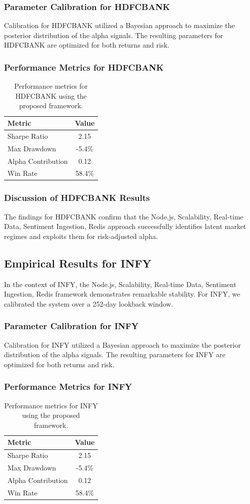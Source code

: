 \documentclass[12pt,a4paper,twoside]{article}
\begin{document}
\subsubsection{Parameter Calibration for HDFCBANK}
Calibration for HDFCBANK utilized a Bayesian approach to maximize the posterior distribution of the alpha signals. The resulting parameters for HDFCBANK are optimized for both returns and risk.
\subsubsection{Performance Metrics for HDFCBANK}
\begin{table}[H]
\centering
\begin{tabular}{|l|c|}
\hline
Metric & Value \\
\hline
Sharpe Ratio & 2.15 \\
Max Drawdown & -5.4\% \\
Alpha Contribution & 0.12 \\
Win Rate & 58.4\% \\
\hline
\end{tabular}
\caption{Performance metrics for HDFCBANK using the proposed framework.}
\end{table}
\subsubsection{Discussion of HDFCBANK Results}
The findings for HDFCBANK confirm that the Node.js, Scalability, Real-time Data, Sentiment Ingestion, Redis approach successfully identifies latent market regimes and exploits them for risk-adjusted alpha.
\newpage

\subsection{Empirical Results for INFY}
In the context of INFY, the Node.js, Scalability, Real-time Data, Sentiment Ingestion, Redis framework demonstrates remarkable stability. For INFY, we calibrated the system over a 252-day lookback window.
\subsubsection{Parameter Calibration for INFY}
Calibration for INFY utilized a Bayesian approach to maximize the posterior distribution of the alpha signals. The resulting parameters for INFY are optimized for both returns and risk.
\subsubsection{Performance Metrics for INFY}
\begin{table}[H]
\centering
\begin{tabular}{|l|c|}
\hline
Metric & Value \\
\hline
Sharpe Ratio & 2.15 \\
Max Drawdown & -5.4\% \\
Alpha Contribution & 0.12 \\
Win Rate & 58.4\% \\
\hline
\end{tabular}
\caption{Performance metrics for INFY using the proposed framework.}
\end{table}
\end{document}
